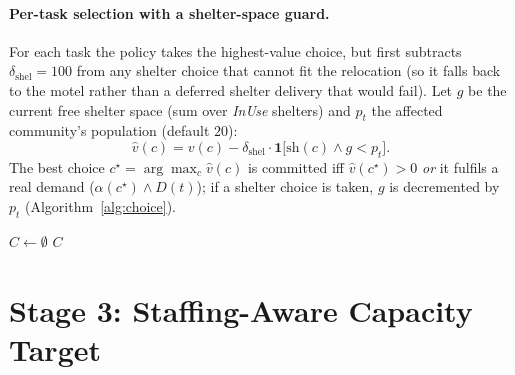 \documentclass[11pt]{article}
\begin{document}
\paragraph{Per-task selection with a shelter-space guard.} For each task the policy takes the
highest-value choice, but first subtracts $\delta_{\text{shel}}=100$ from any shelter choice that
cannot fit the relocation (so it falls back to the motel rather than a deferred shelter delivery
that would fail). Let $g$ be the current free shelter space (sum over \emph{InUse} shelters) and
$p_t$ the affected community's population (default $20$):
\begin{equation}
\hat v(c) = v(c) - \delta_{\text{shel}}\cdot \mathbf{1}\big[\text{sh}(c)\wedge g < p_t\big].
\end{equation}
The best choice $c^\star=\arg\max_c \hat v(c)$ is committed iff $\hat v(c^\star)>0$ \emph{or} it
fulfils a real demand ($\alpha(c^\star)\wedge D(t)$); if a shelter choice is taken, $g$ is decremented
by $p_t$ (Algorithm~\ref{alg:choice}).

\begin{algorithm}[h]
\DontPrintSemicolon
{}
$C \leftarrow \emptyset$\;
\Return $C$\;
\caption{\textsc{LongTermChoiceSelection}}
\label{alg:choice}
\end{algorithm}

\section{Stage 3: Staffing-Aware Capacity Target}
\label{sec:invest}
\end{document}

